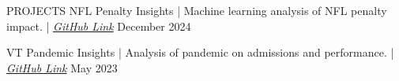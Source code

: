 \begin{rSection}{PROJECTS}
    NFL Penalty Insights | Machine learning analysis of NFL penalty impact. | \href{https://github.com/uehlingeric/NFLPenaltyInsights/tree/main}{\textit{GitHub Link}} \hfill {December 2024}
    
    VT Pandemic Insights | Analysis of pandemic on admissions and performance. | \href{https://github.com/uehlingeric/VTPandemicInsights}{\textit{GitHub Link}} \hfill {May 2023}
\end{rSection}